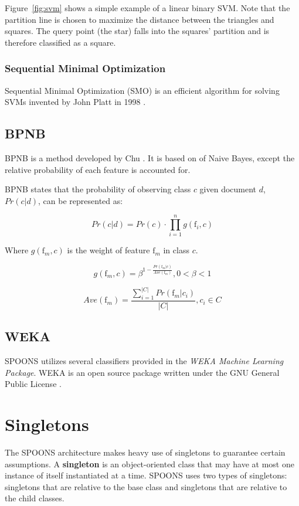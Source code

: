 \documentclass[12pt]{ucthesis}
\begin{document}
Figure~\ref{fig:svm} shows a simple example of a linear binary SVM.
Note that the partition line is chosen to maximize the distance between the triangles and squares.
The query point (the star) falls into the squares' partition and is therefore classified as a square.

\subsubsection{Sequential Minimal Optimization}
\label{background-classifiers-svm-smo}
Sequential Minimal Optimization (SMO) is an efficient algorithm for solving SVMs invented by John Platt in 1998 \cite{Platt}.

\subsection{BPNB}
\label{background-classifiers-bpnb}
BPNB is a method developed by Chu \cite{bpnb}.
It is based on of Naive Bayes, except the relative probability of each feature is accounted for.

BPNB states that the probability of observing class $c$ given document $d$, $Pr(c|d)$, can be represented as:

\begin{equation}
   Pr(c|d) = Pr(c) \cdot \prod_{i = 1}^{n}g(\textrm{f}_{i},c)
\end{equation}

Where $g(\textrm{f}_{m}, c)$ is the weight of feature $\textrm{f}_m$ in class $c$.

\begin{equation}
   g(\textrm{f}_m, c) = \beta^{1 - \frac{Pr(\textrm{f}_m|c)}{Ave(\textrm{f}_m)}}, 0 < \beta < 1
\end{equation}

\begin{equation}
   Ave(\textrm{f}_m) = \frac{\sum_{i=1}^{|C|} Pr(\textrm{f}_m|c_{i})}{|C|}, c_i \in C
\end{equation}

\subsection{WEKA}
\label{background-weka}
SPOONS utilizes several classifiers provided in the \textit{WEKA Machine Learning Package}.
WEKA is an open source package written under the GNU General Public License \cite{weka}.

\section{Singletons}
\label{background-singletons}
The SPOONS architecture makes heavy use of singletons to guarantee certain assumptions.
A \textbf{singleton} is an object-oriented class that may have at most one instance of itself instantiated at a time.
SPOONS uses two types of singletons: singletons that are relative to the base class and singletons that are relative to the
child classes.
\end{document}
